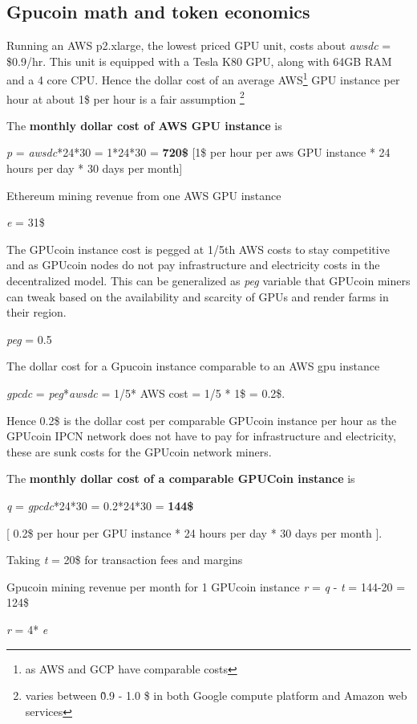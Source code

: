 \subsection{Gpucoin math and token economics}
Running an AWS p2.xlarge, the lowest priced GPU unit, costs about \emph{awsdc} = \$0.9/hr. This unit is equipped with a Tesla K80 GPU, along with 64GB RAM and a 4 core CPU. 
Hence the dollar cost of an average AWS\footnote{as AWS and GCP have comparable costs} GPU instance per hour at about 1\$ per hour is a fair assumption \footnote{ varies between \~ 0.9 - 1.0 \$ in both Google compute platform and Amazon web services}

The \textbf{monthly dollar cost of AWS GPU instance} is

\emph{p} = \emph{awsdc}*24*30 = 1*24*30 = \textbf{720\$  } [1\$ per hour per aws GPU instance * 24 hours per day * 30 days per month]

Ethereum mining revenue from one AWS GPU instance

\emph{e} = 31\$

The GPUcoin instance cost is pegged at 1/5th AWS costs to stay competitive and as GPUcoin nodes do not pay infrastructure and electricity costs in the decentralized model. This can be generalized as \emph{peg} variable that GPUcoin miners can tweak based on the availability and scarcity of GPUs and render farms in their region.

\emph{peg} = 0.5

The dollar cost for a Gpucoin instance comparable to an AWS gpu instance 

\emph{gpcdc} = \emph{peg}*\emph{awsdc} =  1/5* AWS cost = 1/5 * 1\$ = 0.2\$.

 Hence 0.2\$ is the dollar cost per comparable GPUcoin instance per hour as the GPUcoin IPCN network does not have to pay for infrastructure and electricity, these are sunk costs for the GPUcoin network miners.

The \textbf{monthly dollar cost of a comparable GPUCoin instance} is 

\emph{q} = \emph{gpcdc}*24*30 = 0.2*24*30 = \textbf{144\$ }

[ 0.2\$ per hour per GPU instance * 24 hours per day * 30 days per month ].


Taking \emph{t} = 20\$ for transaction fees and margins

Gpucoin mining revenue per month for 1 GPUcoin instance
\emph{r} = \emph{q} - \emph{t} = 144-20 = 124\$

\emph{r} = 4* \emph{e} 

